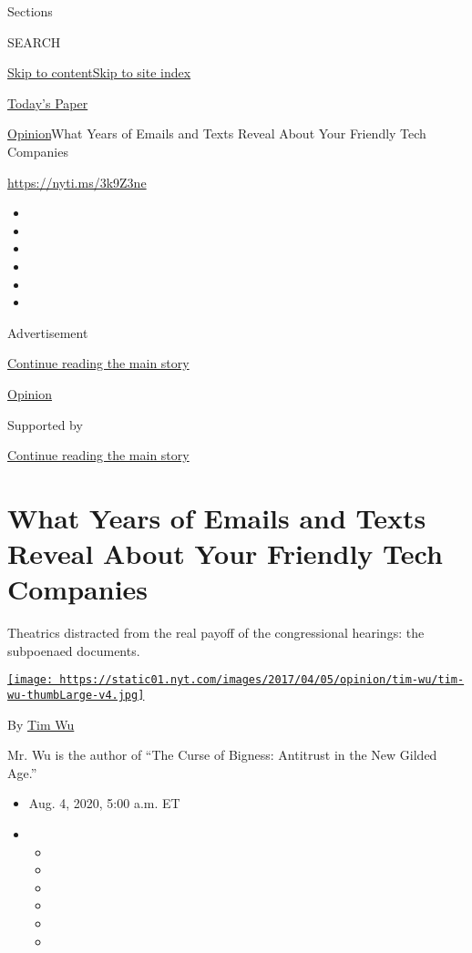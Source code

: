 Sections

SEARCH

\protect\hyperlink{site-content}{Skip to
content}\protect\hyperlink{site-index}{Skip to site index}

\href{https://myaccount.nytimes.com/auth/login?response_type=cookie\&client_id=vi}{}

\href{https://www.nytimes.com/section/todayspaper}{Today's Paper}

\href{/section/opinion}{Opinion}\textbar{}What Years of Emails and Texts
Reveal About Your Friendly Tech Companies

\url{https://nyti.ms/3k9Z3ne}

\begin{itemize}
\item
\item
\item
\item
\item
\item
\end{itemize}

Advertisement

\protect\hyperlink{after-top}{Continue reading the main story}

\href{/section/opinion}{Opinion}

Supported by

\protect\hyperlink{after-sponsor}{Continue reading the main story}

\hypertarget{what-years-of-emails-and-texts-reveal-about-your-friendly-tech-companies}{%
\section{What Years of Emails and Texts Reveal About Your Friendly Tech
Companies}\label{what-years-of-emails-and-texts-reveal-about-your-friendly-tech-companies}}

Theatrics distracted from the real payoff of the congressional hearings:
the subpoenaed documents.

\href{https://www.nytimes.com/by/tim-wu}{\texttt{[image: https://static01.nyt.com/images/2017/04/05/opinion/tim-wu/tim-wu-thumbLarge-v4.jpg]}}

By \href{https://www.nytimes.com/by/tim-wu}{Tim Wu}

Mr. Wu is the author of ``The Curse of Bigness: Antitrust in the New
Gilded Age.''

\begin{itemize}
\item
  Aug. 4, 2020, 5:00 a.m. ET
\item
  \begin{itemize}
  \item
  \item
  \item
  \item
  \item
  \item
  \end{itemize}
\end{itemize}

